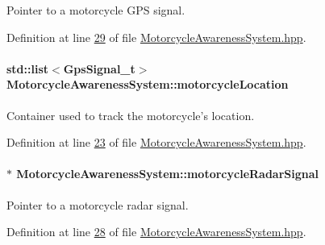 Pointer to a motorcycle G\-P\-S signal. 



Definition at line \hyperlink{MotorcycleAwarenessSystem_8hpp_source_l00029}{29} of file \hyperlink{MotorcycleAwarenessSystem_8hpp_source}{Motorcycle\-Awareness\-System.\-hpp}.

\hypertarget{classMotorcycleAwarenessSystem_af6becfeb1d11b467cb80a94a8e6940ac}{
\paragraph[{motorcycle\-Location}]{\setlength{\rightskip}{0pt plus 5cm}std\-::list$<${\bf Gps\-Signal\-\_\-t}$>$ Motorcycle\-Awareness\-System\-::motorcycle\-Location\hspace{0.3cm}{\ttfamily [private]}}}\label{classMotorcycleAwarenessSystem_af6becfeb1d11b467cb80a94a8e6940ac}


Container used to track the motorcycle's location. 



Definition at line \hyperlink{MotorcycleAwarenessSystem_8hpp_source_l00023}{23} of file \hyperlink{MotorcycleAwarenessSystem_8hpp_source}{Motorcycle\-Awareness\-System.\-hpp}.

\hypertarget{classMotorcycleAwarenessSystem_a0744e71b9f440a86f5078c876ba7629b}{
\paragraph[{motorcycle\-Radar\-Signal}]{$\ast$ Motorcycle\-Awareness\-System\-::motorcycle\-Radar\-Signal\hspace{0.3cm}{\ttfamily [private]}}}\label{classMotorcycleAwarenessSystem_a0744e71b9f440a86f5078c876ba7629b}


Pointer to a motorcycle radar signal. 



Definition at line \hyperlink{MotorcycleAwarenessSystem_8hpp_source_l00028}{28} of file \hyperlink{MotorcycleAwarenessSystem_8hpp_source}{Motorcycle\-Awareness\-System.\-hpp}.

